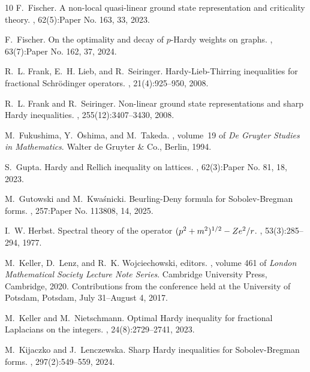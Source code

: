 \documentclass[12pt, a4paper]{amsart}
\begin{document}
\begin{thebibliography}{10}
F.~Fischer.
\newblock A non-local quasi-linear ground state representation and criticality theory.
, 62(5):Paper No. 163, 33, 2023.

F.~Fischer.
\newblock On the optimality and decay of {$p$}-{H}ardy weights on graphs.
, 63(7):Paper No. 162, 37, 2024.

R.~L. Frank, E.~H. Lieb, and R.~Seiringer.
\newblock Hardy-{L}ieb-{T}hirring inequalities for fractional {S}chr\"odinger operators.
, 21(4):925--950, 2008.

R.~L. Frank and R.~Seiringer.
\newblock Non-linear ground state representations and sharp {H}ardy inequalities.
, 255(12):3407--3430, 2008.

M.~Fukushima, Y.~\={O}shima, and M.~Takeda.
, volume~19 of {\em De Gruyter Studies in Mathematics}.
\newblock Walter de Gruyter \& Co., Berlin, 1994.

S.~Gupta.
\newblock Hardy and {R}ellich inequality on lattices.
, 62(3):Paper No. 81, 18, 2023.

M.~Gutowski and M.~Kwa\'{s}nicki.
\newblock Beurling-{D}eny formula for {S}obolev-{B}regman forms.
, 257:Paper No. 113808, 14, 2025.

I.~W. Herbst.
\newblock Spectral theory of the operator {$(p\sp{2}+m\sp{2})\sp{1/2}-Ze\sp{2}/r$}.
, 53(3):285--294, 1977.

M.~Keller, D.~Lenz, and R.~K. Wojciechowski, editors.
, volume 461 of {\em London Mathematical Society Lecture Note Series}.
\newblock Cambridge University Press, Cambridge, 2020.
\newblock Contributions from the conference held at the University of Potsdam, Potsdam, July 31--August 4, 2017.

M.~Keller and M.~Nietschmann.
\newblock Optimal {H}ardy inequality for fractional {L}aplacians on the integers.
, 24(8):2729--2741, 2023.

M.~Kijaczko and J.~Lenczewska.
\newblock Sharp {H}ardy inequalities for {S}obolev-{B}regman forms.
, 297(2):549--559, 2024.


\end{thebibliography}
\end{document}
